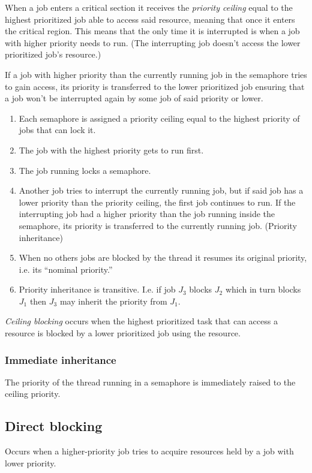\documentclass[a4paper]{article}
\begin{document}
When a job enters a critical section it receives the \emph{priority ceiling} 
equal to the highest prioritized job able to access said resource, meaning that
once it enters the critical region. This means that the only time it is
interrupted is when a job with higher priority needs to run. (The interrupting
job doesn't access the lower prioritized job's resource.)

If a job with higher priority than the currently running job in the semaphore
tries to gain access, its priority is transferred to the lower prioritized job
ensuring that a job won't be interrupted again by some job of said priority or
lower.

\begin{enumerate}
  \item Each semaphore is assigned a priority ceiling equal to the highest
        priority of jobs that can lock it.
  \item The job with the highest priority gets to run first.
  \item The job running locks a semaphore.
  \item Another job tries to interrupt the currently running job, but if said
        job has a lower priority than the priority ceiling, the first job
        continues to run. If the interrupting job had a higher priority than
        the job running inside the semaphore, its priority is transferred to the
        currently running job. (Priority inheritance)
  \item When no others jobs are blocked by the thread it resumes its original
        priority, i.e. its ``nominal priority.''
  \item Priority inheritance is transitive. I.e. if job $J_3$ blocks $J_2$ which
        in turn blocks $J_1$ then $J_3$ may inherit the priority from $J_1$.
\end{enumerate}

\emph{Ceiling blocking} occurs when the highest prioritized task that can access
a resource is blocked by a lower prioritized job using the resource.

\subsubsection{Immediate inheritance}
The priority of the thread running in a semaphore is immediately raised to the
ceiling priority.

\subsection{Direct blocking}
Occurs when a higher-priority job tries to acquire resources held by a job
with lower priority.
\end{document}
